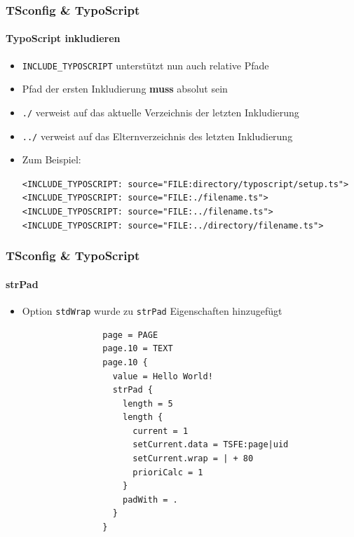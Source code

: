 
\begin{frame}[fragile]
	\frametitle{TSconfig \& TypoScript}
	\framesubtitle{TypoScript inkludieren}

	\begin{itemize}
		\item \texttt{INCLUDE\_TYPOSCRIPT} unterstützt nun auch relative Pfade
		\item Pfad der ersten Inkludierung \textbf{muss} absolut sein
		\item \texttt{./} verweist auf das aktuelle Verzeichnis der letzten Inkludierung
		\item \texttt{../} verweist auf das Elternverzeichnis des letzten Inkludierung
		\item Zum Beispiel:

			\lstinline!<INCLUDE_TYPOSCRIPT: source="FILE:directory/typoscript/setup.ts">!
			\lstinline!<INCLUDE_TYPOSCRIPT: source="FILE:./filename.ts">!
			\lstinline!<INCLUDE_TYPOSCRIPT: source="FILE:../filename.ts">!
			\lstinline!<INCLUDE_TYPOSCRIPT: source="FILE:../directory/filename.ts">!

	\end{itemize}

\end{frame}


\begin{frame}[fragile]
	\frametitle{TSconfig \& TypoScript}
	\framesubtitle{strPad}

	\begin{itemize}
		\item Option \texttt{stdWrap} wurde zu \texttt{strPad} Eigenschaften hinzugefügt

			\begin{lstlisting}
				page = PAGE
				page.10 = TEXT
				page.10 {
				  value = Hello World!
				  strPad {
				    length = 5
				    length {
				      current = 1
				      setCurrent.data = TSFE:page|uid
				      setCurrent.wrap = | + 80
				      prioriCalc = 1
				    }
				    padWith = .
				  }
				}
			\end{lstlisting}

	\end{itemize}

\end{frame}


